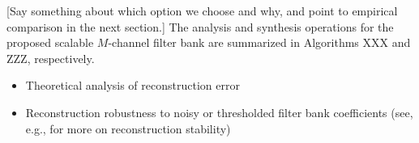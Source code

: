\documentclass[journal, 10pt]{IEEEtran}
\begin{document}



{\color{red}
[Say something about which option we choose and why, and point to empirical comparison in the next section.]
The analysis and synthesis operations for the proposed scalable $M$-channel filter bank are summarized in Algorithms XXX and ZZZ, respectively.

\begin{itemize}
\item Theoretical analysis of reconstruction error
\item Reconstruction robustness to noisy or thresholded filter bank coefficients (see, e.g., \cite[Section III.B]{anis2016efficient} for more on reconstruction stability)
\end{itemize}
}
\end{document}
